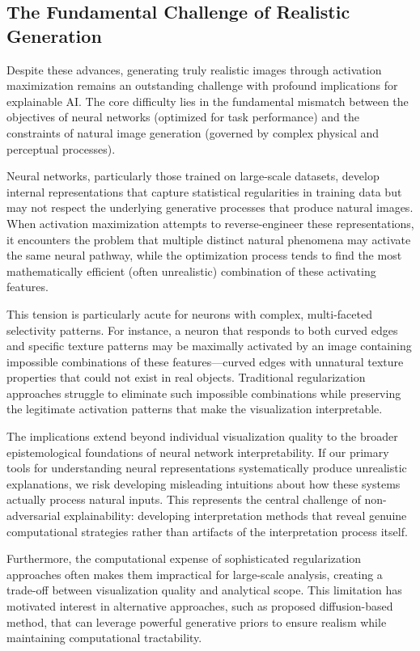 \subsection{The Fundamental Challenge of Realistic Generation}

Despite these advances, generating truly realistic images through activation maximization remains an outstanding challenge with profound implications for explainable AI. The core difficulty lies in the fundamental mismatch between the objectives of neural networks (optimized for task performance) and the constraints of natural image generation (governed by complex physical and perceptual processes).

Neural networks, particularly those trained on large-scale datasets, develop internal representations that capture statistical regularities in training data but may not respect the underlying generative processes that produce natural images. When activation maximization attempts to reverse-engineer these representations, it encounters the problem that multiple distinct natural phenomena may activate the same neural pathway, while the optimization process tends to find the most mathematically efficient (often unrealistic) combination of these activating features.

This tension is particularly acute for neurons with complex, multi-faceted selectivity patterns. For instance, a neuron that responds to both curved edges and specific texture patterns may be maximally activated by an image containing impossible combinations of these features—curved edges with unnatural texture properties that could not exist in real objects. Traditional regularization approaches struggle to eliminate such impossible combinations while preserving the legitimate activation patterns that make the visualization interpretable.

The implications extend beyond individual visualization quality to the broader epistemological foundations of neural network interpretability. If our primary tools for understanding neural representations systematically produce unrealistic explanations, we risk developing misleading intuitions about how these systems actually process natural inputs. This represents the central challenge of non-adversarial explainability: developing interpretation methods that reveal genuine computational strategies rather than artifacts of the interpretation process itself.

Furthermore, the computational expense of sophisticated regularization approaches often makes them impractical for large-scale analysis, creating a trade-off between visualization quality and analytical scope. This limitation has motivated interest in alternative approaches, such as proposed diffusion-based method, that can leverage powerful generative priors to ensure realism while maintaining computational tractability.

